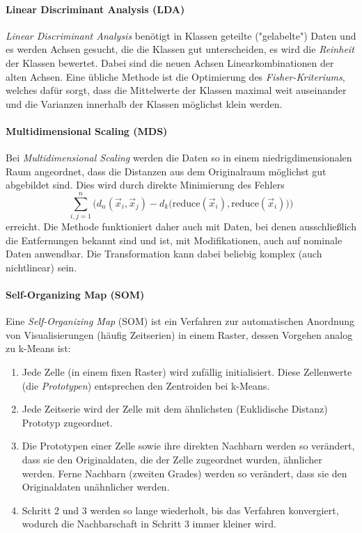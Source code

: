 			\paragraph{Linear Discriminant Analysis (LDA)}
				\emph{Linear Discriminant Analysis} benötigt in Klassen geteilte ("gelabelte") Daten und es werden Achsen gesucht, die die Klassen gut unterscheiden, \dh es wird die \emph{Reinheit} der Klassen bewertet. Dabei sind die neuen Achsen Linearkombinationen der alten Achsen. Eine übliche Methode ist die Optimierung des \emph{Fisher-Kriteriums}, welches dafür sorgt, dass die Mittelwerte der Klassen maximal weit auseinander und die Varianzen innerhalb der Klassen möglichst klein werden.

			\paragraph{Multidimensional Scaling (MDS)}
				Bei \emph{Multidimensional Scaling} werden die Daten so in einem niedrigdimensionalen Raum angeordnet, dass die Distanzen aus dem Originalraum möglichst gut abgebildet sind. Dies wird durch direkte Minimierung des Fehlers
				\begin{equation}
					\sum_{i, j = 1}^{n} \bigl( d_n(\vec{x}_i, \vec{x}_j) - d_k\bigl( \mathrm{reduce}(\vec{x}_i), \mathrm{reduce}(\vec{x}_i) \bigr) \bigr)
				\end{equation}
				erreicht. Die Methode funktioniert daher auch mit Daten, bei denen ausschließlich die Entfernungen bekannt sind und ist, mit Modifikationen, auch auf nominale Daten anwendbar. Die Transformation kann dabei beliebig komplex (auch nichtlinear) sein.

			\paragraph{Self-Organizing Map (SOM)}
				\label{p:som}

				Eine \emph{Self-Organizing Map} (SOM) ist ein Verfahren zur automatischen Anordnung von Visualisierungen (häufig Zeitserien) in einem Raster, dessen Vorgehen analog zu k-Means ist:
				\begin{enumerate}
					\item Jede Zelle (in einem fixen Raster) wird zufällig initialisiert. Diese Zellenwerte (die \emph{Prototypen}) entsprechen den Zentroiden bei k-Means.
					\item Jede Zeitserie wird der Zelle mit dem ähnlichsten (\bspw Euklidische Distanz) Prototyp zugeordnet.
					\item Die Prototypen einer Zelle sowie ihre direkten Nachbarn werden so verändert, dass sie den Originaldaten, die der Zelle zugeordnet wurden, ähnlicher werden. Ferne Nachbarn (zweiten Grades) werden so verändert, dass sie den Originaldaten unähnlicher werden.
					\item Schritt 2 und 3 werden so lange wiederholt, bis das Verfahren konvergiert, wodurch die Nachbarschaft in Schritt 3 immer kleiner wird.
				\end{enumerate}

